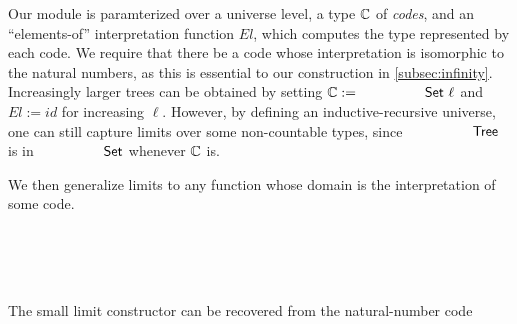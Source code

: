 Our module is paramterized over a universe level, a type ${\mathbb{C}}$ of \textit{codes}, and an ``elements-of'' interpretation
function $\mathit{El}$, which computes the type represented by each code.
We require that there be a code whose interpretation is isomorphic to the natural numbers,
as this is essential to our construction in \cref{subsec:infinity}.
Increasingly larger trees can be obtained by setting $\bC := \AgdaPrimitive{Set} \ \ell$ and
$\mathit{El} := \mathit{id}$ for increasing $\ell$.
However, by defining an inductive-recursive universe,
one can still capture limits over some non-countable types, since
 $\AgdaDatatype{Tree}$ is in $\AgdaPrimitive{Set}$ whenever ${\mathbb{C}}$ is.

We then generalize limits to any function whose domain is the interpretation of some code.
\begin{code}%
%
\>[4]\AgdaSpace{}%
\AgdaSpace{}%
\AgdaSymbol{:}\AgdaSpace{}%
\AgdaSpace{}%
\AgdaSpace{}%
\<%
\\
\>[4][@{}l@{\AgdaIndent{0}}]%
\>[6]\AgdaSpace{}%
\AgdaSymbol{:}\AgdaSpace{}%
\<%
\\
%
\>[6]\AgdaSpace{}%
\AgdaSymbol{:}\AgdaSpace{}%
\AgdaSpace{}%
\AgdaSpace{}%
\<%
\\
%
\>[6]\AgdaSpace{}%
\AgdaSymbol{:}\AgdaSpace{}%
%
\>[15]\AgdaSymbol{(}\AgdaSpace{}%
\AgdaSymbol{:}\AgdaSpace{}%
\AgdaSpace{}%
\AgdaSymbol{)}\AgdaSpace{}%
\AgdaSpace{}%
\AgdaSymbol{(}\AgdaSpace{}%
\AgdaSymbol{:}\AgdaSpace{}%
\AgdaSpace{}%
\AgdaSpace{}%
\AgdaSpace{}%
\AgdaSymbol{)}\AgdaSpace{}%
\AgdaSpace{}%
\<%
\end{code}

The small limit constructor can be recovered from the natural-number code
\begin{code}%
%
\>[4]\AgdaSpace{}%
\AgdaSymbol{:}\AgdaSpace{}%
\AgdaSymbol{(}\AgdaSpace{}%
\AgdaSpace{}%
\AgdaSymbol{)}\AgdaSpace{}%
\AgdaSpace{}%
\<%
\\
%
\>[4]\AgdaSpace{}%
\AgdaSpace{}%
\AgdaSymbol{=}\AgdaSpace{}%
\AgdaSpace{}%
%
\>[21]\AgdaSpace{}%
\AgdaSpace{}%
\AgdaSpace{}%
\AgdaSpace{}%
\AgdaSymbol{(}\AgdaSpace{}%
\AgdaSpace{}%
\AgdaSymbol{))}\<%
\end{code}

